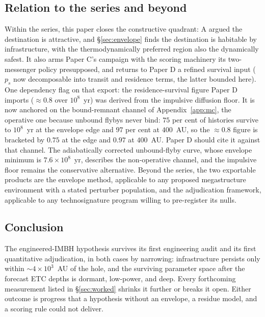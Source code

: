\documentclass[11pt]{article}
\begin{document}
\subsection{Relation to the series and beyond}

Within the series, this paper closes the constructive quadrant: A argued the destination is attractive, and \S\ref{sec:envelope} finds the destination is habitable by infrastructure, with the thermodynamically preferred region also the dynamically safest. It also arms Paper C's campaign with the scoring machinery its two-messenger policy presupposed, and returns to Paper D a refined survival input ($p_{s}$ now decomposable into transit and residence terms, the latter bounded here). One dependency flag on that export: the residence-survival figure Paper D imports ($\approx 0.8$ over $10^{8}$~yr) was derived from the impulsive diffusion floor. It is now anchored on the bound-remnant channel of Appendix~\ref{app:mc}, the operative one because unbound flybys never bind: $75$ per cent of histories survive to $10^{8}$~yr at the envelope edge and $97$ per cent at $400$~AU, so the $\approx 0.8$ figure is bracketed by $0.75$ at the edge and $0.97$ at $400$~AU. Paper D should cite it against that channel. The adiabatically corrected unbound-flyby curve, whose envelope minimum is $7.6\times10^{8}$~yr, describes the non-operative channel, and the impulsive floor remains the conservative alternative. Beyond the series, the two exportable products are the envelope method, applicable to any proposed megastructure environment with a stated perturber population, and the adjudication framework, applicable to any technosignature program willing to pre-register its nulls.

\subsection{Conclusion}

The engineered-IMBH hypothesis survives its first engineering audit and its first quantitative adjudication, in both cases by narrowing: infrastructure persists only within $\sim 4\times10^{3}$~AU of the hole, and the surviving parameter space after the forecast ETC depths is dormant, low-power, and deep. Every forthcoming measurement listed in \S\ref{sec:worked} shrinks it further or breaks it open. Either outcome is progress that a hypothesis without an envelope, a residue model, and a scoring rule could not deliver.

\appendix
\end{document}

